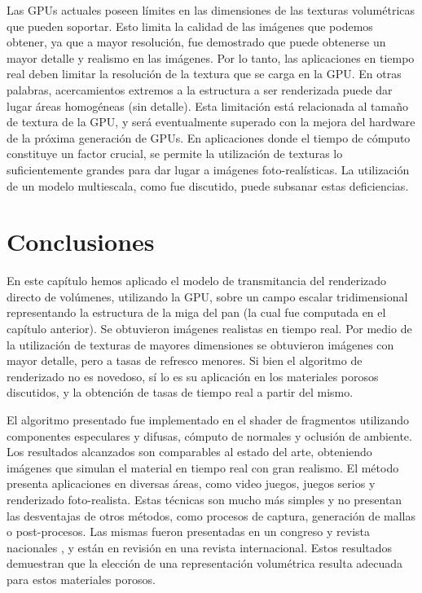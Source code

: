 Las GPUs actuales poseen límites en las dimensiones de las texturas volumétricas que pueden soportar.
Esto limita la calidad de las imágenes que podemos obtener, ya que a mayor resolución, fue demostrado que puede obtenerse un mayor detalle y realismo en las imágenes.
Por lo tanto, las aplicaciones en tiempo real deben limitar la resolución de la textura que se carga en la GPU.
En otras palabras, acercamientos extremos a la estructura a ser renderizada puede dar lugar áreas homogéneas (sin detalle).
Esta limitación está relacionada al tamaño de textura de la GPU, y será eventualmente superado con la mejora del hardware de la próxima generación de GPUs.
En aplicaciones donde el tiempo de cómputo constituye un factor crucial, se permite la utilización de texturas lo suficientemente grandes para dar lugar a imágenes foto-realísticas.
La utilización de un modelo multiescala, como fue discutido, puede subsanar estas deficiencias.

\section{Conclusiones}

En este capítulo hemos aplicado el modelo de transmitancia del renderizado directo de volúmenes, utilizando la GPU, sobre un campo escalar tridimensional representando la estructura de la miga del pan (la cual fue computada en el capítulo anterior).
Se obtuvieron imágenes realistas en tiempo real.
Por medio de la utilización de texturas de mayores dimensiones se obtuvieron imágenes con mayor detalle, pero a tasas de refresco menores.
Si bien el algoritmo de renderizado no es novedoso, sí lo es su aplicación en los materiales porosos discutidos, y la obtención de tasas de tiempo real a partir del mismo.

El algoritmo presentado fue implementado en el shader de fragmentos utilizando componentes especulares y difusas, cómputo de normales y oclusión de ambiente.
Los resultados alcanzados son comparables al estado del arte, obteniendo imágenes que simulan el material en tiempo real con gran realismo.
El método presenta aplicaciones en diversas áreas, como video juegos, juegos serios \cite{Susi2007} y renderizado foto-realista.
Estas técnicas son mucho más simples y no presentan las desventajas de otros métodos, como procesos de captura, generación de mallas o post-procesos.
Las mismas fueron presentadas en un congreso y revista nacionales \cite{Baravalle2014}, y están en revisión en una revista internacional.
Estos resultados demuestran que la elección de una representación volumétrica resulta adecuada para estos materiales porosos.



